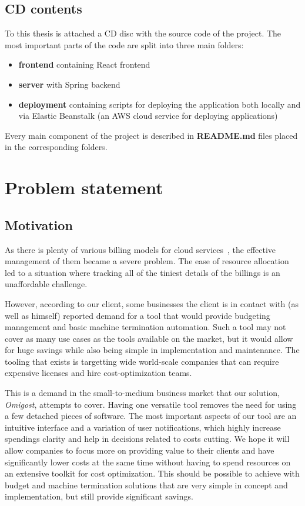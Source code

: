 \documentclass[licencjacka,en]{thesisclass}
\begin{document}
    \section{CD contents}
    To this thesis is attached a CD disc with the source code of the project.
    The most important parts of the code are split into three main folders:
    \begin{itemize}
        \item \textbf{frontend} containing React frontend
        \item \textbf{server} with Spring backend
        \item \textbf{deployment} containing scripts for deploying the application both locally and via Elastic Beanstalk (an AWS cloud service for deploying applications)
    \end{itemize}
    Every main component of the project is described in
    \textbf{README.md} files placed in the corresponding folders.

    \chapter{Problem statement}

    \section{Motivation}

    As there is plenty of various billing models for cloud services~\cite{Laatikainen},
    the effective management of them became a severe problem.
    The ease of resource allocation led to a situation where tracking all of
    the tiniest details of the billings is an unaffordable challenge.

    However, according to our client, some businesses the client is in contact with
    (as well as himself) reported demand for a tool that would provide budgeting management
    and basic machine termination automation.
    Such a tool may not cover as many use cases as the tools
    available on the market, but it would allow for huge savings while
    also being simple in implementation and maintenance.
    The tooling that exists is targetting wide world-scale companies
    that can require expensive licenses and hire cost-optimization teams.

    This is a demand in the small-to-medium business market that our solution,
    \textit{Omigost}, attempts to cover.
    Having one versatile tool removes the need for using a few detached pieces of software.
    The most important aspects of our tool are an intuitive interface and a variation
    of user notifications, which highly increase spendings clarity
    and help in decisions related to costs cutting.
    We hope it will allow companies to focus more on providing value to their clients
    and have significantly lower costs at the same time without having to spend resources
    on an extensive toolkit for cost optimization.
    This should be possible to achieve with budget and machine termination solutions
    that are very simple in concept and implementation, but still provide significant savings.
\end{document}
